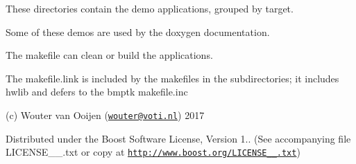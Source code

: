 These directories contain the demo applications, grouped by target.

Some of these demos are used by the doxygen documentation.

The makefile can clean or build the applications.

The makefile.\+link is included by the makefiles in the subdirectories; it includes hwlib and defers to the bmptk makefile.\+inc

(c) Wouter van Ooijen (\href{mailto:wouter@voti.nl}{\tt wouter@voti.\+nl}) 2017

Distributed under the Boost Software License, Version 1.. (See accompanying file L\+I\+C\+E\+N\+S\+E\+\_\+\_.\+txt or copy at \href{http://www.boost.org/LICENSE_1_0.txt}{\tt http\+://www.\+boost.\+org/\+L\+I\+C\+E\+N\+S\+E\+\_\+\_.\+txt}) 